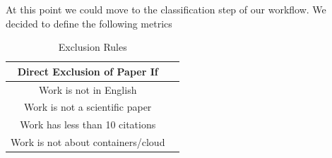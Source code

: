 \begin{multicols}{2}
At this point we could move to the classification step of our workflow. We decided to define the following  metrics

\begin{table}[H]
\centering
\begin{tabular}{c c}
\hline
Direct Exclusion of Paper If \\ \hline
Work is not in English \\ 
Work is not a scientific paper \\ 
Work has less than 10 citations \\ 
Work is not about containers/cloud \\ \hline
\end{tabular}
    \caption{Exclusion Rules}
    \label{tab:Exclusion Rules}
\end{table}

\end{multicols}